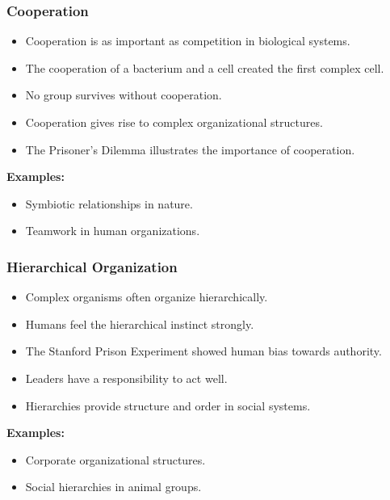 \begin{frame}[fragile]\frametitle{Cooperation}
\begin{itemize}
    \item Cooperation is as important as competition in biological systems.
    \item The cooperation of a bacterium and a cell created the first complex cell.
    \item No group survives without cooperation.
    \item Cooperation gives rise to complex organizational structures.
    \item The Prisoner’s Dilemma illustrates the importance of cooperation.
\end{itemize}
\textbf{Examples:}
\begin{itemize}
    \item Symbiotic relationships in nature.
    \item Teamwork in human organizations.
\end{itemize}
\end{frame}

\begin{frame}[fragile]\frametitle{Hierarchical Organization}
\begin{itemize}
    \item Complex organisms often organize hierarchically.
    \item Humans feel the hierarchical instinct strongly.
    \item The Stanford Prison Experiment showed human bias towards authority.
    \item Leaders have a responsibility to act well.
    \item Hierarchies provide structure and order in social systems.
\end{itemize}
\textbf{Examples:}
\begin{itemize}
    \item Corporate organizational structures.
    \item Social hierarchies in animal groups.
\end{itemize}
\end{frame}

